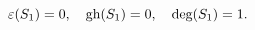 \begin{equation}\label{4.10a}
\varepsilon(S_1)=0,\quad \hbox{gh}(S_1)=0,\quad \hbox{deg}(S_1)=1.
\end{equation}

